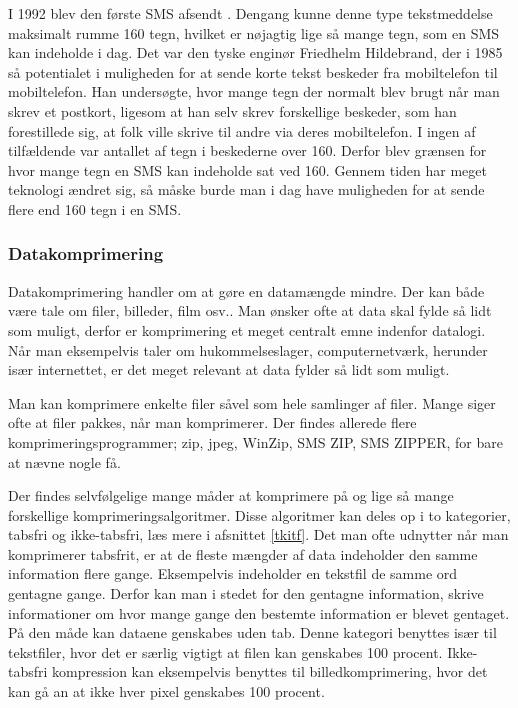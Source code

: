 I 1992 blev den første SMS afsendt \cite{museum}. Dengang kunne denne type tekstmeddelse maksimalt rumme 160 tegn, hvilket er nøjagtig lige så mange tegn, som en SMS kan indeholde i dag. Det var den tyske enginør Friedhelm Hildebrand, der i 1985 så potentialet i muligheden for at sende korte tekst beskeder fra mobiltelefon til mobiltelefon. Han undersøgte, hvor mange tegn der normalt blev brugt når man skrev et postkort, ligesom at han selv skrev forskellige beskeder, som han forestillede sig, at folk ville skrive til andre via deres mobiltelefon. I ingen af tilfældende var antallet af tegn i beskederne over 160. Derfor blev grænsen for hvor mange tegn en SMS kan indeholde sat ved 160.
Gennem tiden har meget teknologi ændret sig, så måske burde man i dag have muligheden for at sende flere end 160 tegn i en SMS. \cite{hillebrand}

\subsubsection {Datakomprimering}

Datakomprimering handler om at gøre en datamængde mindre. Der kan både være tale om filer, billeder, film osv.. Man ønsker ofte at data skal fylde så lidt som muligt, derfor er komprimering et meget centralt emne indenfor datalogi. Når man eksempelvis taler om hukommelseslager, computernetværk, herunder især internettet, er det meget relevant at data fylder så lidt som muligt.
 
Man kan komprimere enkelte filer såvel som hele samlinger af filer. Mange siger ofte at filer pakkes, når man komprimerer. Der findes allerede flere komprimeringsprogrammer; zip, jpeg, WinZip, SMS ZIP, SMS ZIPPER, for bare at nævne nogle få.

Der findes selvfølgelige mange måder at komprimere på og lige så mange forskellige komprimeringsalgoritmer. Disse algoritmer kan deles op i to kategorier, tabsfri og ikke-tabsfri, læs mere i afsnittet \ref{tkitf}.
Det man ofte udnytter når man komprimerer tabsfrit, er at de fleste mængder af data indeholder den samme information flere gange. Eksempelvis indeholder en tekstfil de samme ord gentagne gange. Derfor kan man i stedet for den gentagne information, skrive informationer om hvor mange gange den bestemte information er blevet gentaget. På den måde kan dataene genskabes uden tab. Denne kategori benyttes især til tekstfiler, hvor det er særlig vigtigt at filen kan genskabes 100 procent. Ikke-tabsfri kompression kan eksempelvis benyttes til billedkomprimering, hvor det kan gå an at ikke hver pixel genskabes 100 procent.
